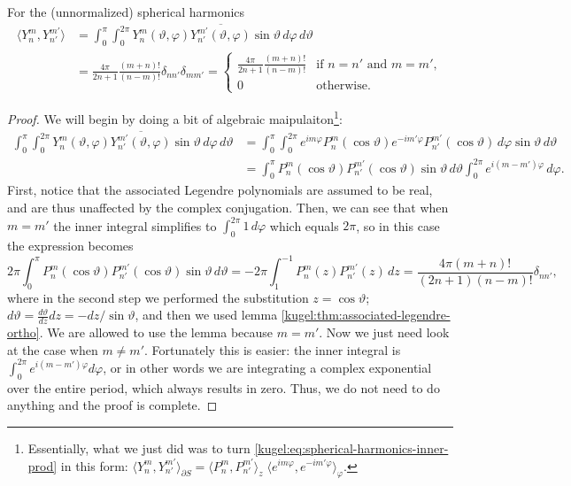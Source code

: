 \begin{theorem} For the (unnormalized) spherical harmonics
  \label{kugel:thm:spherical-harmonics-ortho}
  \begin{align}
    \langle Y^m_n, Y^{m'}_{n'} \rangle
    &= \int_{0}^\pi \int_0^{2\pi}
      Y^m_n(\vartheta, \varphi) \overline{Y^{m'}_{n'}(\vartheta, \varphi)}
      \sin \vartheta \, d\varphi \, d\vartheta
      \label{kugel:eq:spherical-harmonics-inner-prod} \\
    &= \frac{4\pi}{2n + 1} \frac{(m + n)!}{(n - m)!} \delta_{nn'} \delta_{mm'}
    = \begin{cases}
      \frac{4\pi}{2n + 1} \frac{(m + n)!}{(n - m)!}
        & \text{if } n = n' \text{ and } m = m', \nonumber \\
      0 & \text{otherwise}.
    \end{cases}
  \end{align}
\end{theorem}
\begin{proof}
  We will begin by doing a bit of algebraic maipulaiton\footnote{
    Essentially, what we just did was to turn
    \eqref{kugel:eq:spherical-harmonics-inner-prod} in this form:
    \(
      \langle Y^m_n, Y^{m'}_{n'} \rangle_{\partial S}
      = \langle P^m_n, P^{m'}_{n'} \rangle_z
      \; \langle e^{im\varphi}, e^{-im'\varphi} \rangle_\varphi
    \).
  }:
  \begin{align*}
    \int_{0}^\pi \int_0^{2\pi}
      Y^m_n(\vartheta, \varphi) \overline{Y^{m'}_{n'}(\vartheta, \varphi)} 
      \sin \vartheta \, d\varphi \, d\vartheta
    &= \int_{0}^\pi \int_0^{2\pi}
      e^{im\varphi} P^m_n(\cos \vartheta)
      e^{-im'\varphi} P^{m'}_{n'}(\cos \vartheta)
      \, d\varphi \sin \vartheta \, d\vartheta 
    \\
    &= \int_{0}^\pi
      P^m_n(\cos \vartheta) P^{m'}_{n'}(\cos \vartheta) \sin \vartheta \, d\vartheta
      \int_0^{2\pi} e^{i(m - m')\varphi}
      \, d\varphi. 
  \end{align*}
  First, notice that the associated Legendre polynomials are assumed to be real,
  and are thus unaffected by the complex conjugation. Then, we can see that when
  $m = m'$ the inner integral simplifies to $\int_0^{2\pi} 1 \, d\varphi$ which
  equals $2\pi$, so in this case the expression becomes
  \begin{equation*}
    2\pi \int_{0}^\pi
      P^m_n(\cos \vartheta) P^{m'}_{n'}(\cos \vartheta)
    \sin \vartheta \, d\vartheta
    = -2\pi \int_{1}^{-1} P^m_n(z) P^{m'}_{n'}(z) \, dz
    = \frac{4\pi(m + n)!}{(2n + 1)(n - m)!} \delta_{nn'},
  \end{equation*}
  where in the second step we performed the substitution $z = \cos\vartheta$;
  $d\vartheta = \frac{d\vartheta}{dz} dz= - dz / \sin \vartheta$, and then we
  used lemma \ref{kugel:thm:associated-legendre-ortho}.  We are allowed to use
  the lemma because $m = m'$. Now we just need look at the case when $m \neq
  m'$. Fortunately this is easier: the inner integral is $\int_0^{2\pi} e^{i(m -
  m')\varphi} d\varphi$, or in other words we are integrating a complex
  exponential over the entire period, which always results in zero. Thus, we do
  not need to do anything and the proof is complete.
\end{proof}

